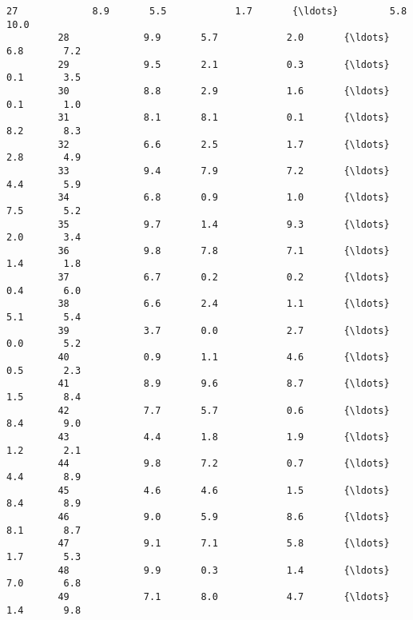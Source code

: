 \documentclass[11pt]{article}
\begin{document}
\begin{Verbatim}[commandchars=\\\{\}]
         27             8.9       5.5            1.7       {\ldots}         5.8      10.0   
         28             9.9       5.7            2.0       {\ldots}         6.8       7.2   
         29             9.5       2.1            0.3       {\ldots}         0.1       3.5   
         30             8.8       2.9            1.6       {\ldots}         0.1       1.0   
         31             8.1       8.1            0.1       {\ldots}         8.2       8.3   
         32             6.6       2.5            1.7       {\ldots}         2.8       4.9   
         33             9.4       7.9            7.2       {\ldots}         4.4       5.9   
         34             6.8       0.9            1.0       {\ldots}         7.5       5.2   
         35             9.7       1.4            9.3       {\ldots}         2.0       3.4   
         36             9.8       7.8            7.1       {\ldots}         1.4       1.8   
         37             6.7       0.2            0.2       {\ldots}         0.4       6.0   
         38             6.6       2.4            1.1       {\ldots}         5.1       5.4   
         39             3.7       0.0            2.7       {\ldots}         0.0       5.2   
         40             0.9       1.1            4.6       {\ldots}         0.5       2.3   
         41             8.9       9.6            8.7       {\ldots}         1.5       8.4   
         42             7.7       5.7            0.6       {\ldots}         8.4       9.0   
         43             4.4       1.8            1.9       {\ldots}         1.2       2.1   
         44             9.8       7.2            0.7       {\ldots}         4.4       8.9   
         45             4.6       4.6            1.5       {\ldots}         8.4       8.9   
         46             9.0       5.9            8.6       {\ldots}         8.1       8.7   
         47             9.1       7.1            5.8       {\ldots}         1.7       5.3   
         48             9.9       0.3            1.4       {\ldots}         7.0       6.8   
         49             7.1       8.0            4.7       {\ldots}         1.4       9.8   
         

\end{Verbatim}
\end{document}
